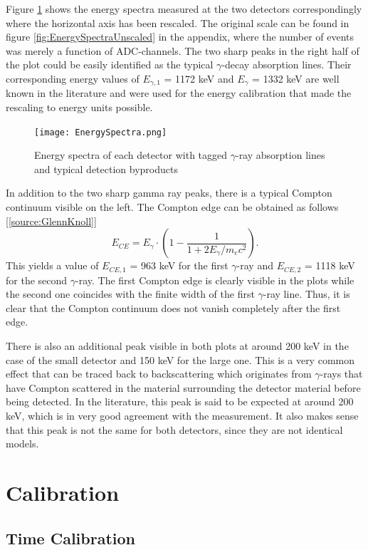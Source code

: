\documentclass[a4paper,parskip,11pt, DIV12]{scrreprt}
\begin{document}
		Figure \ref{fig:EnergySpectra} shows the energy spectra measured at the two detectors correspondingly where the horizontal axis has been rescaled. The original scale can be found in figure \ref{fig:EnergySpectraUnscaled} in the appendix, where the number of events was merely a function of ADC-channels. The two sharp peaks in the right half of the plot could be easily identified as the typical $\gamma$-decay absorption lines. Their corresponding energy values of $E_{\gamma,1}$ = 1172 keV and $E_{\gamma}$ = 1332 keV are well known in the literature and were used for the energy calibration that made the rescaling to energy units possible.	
		\begin{figure}[H]
\centering
\texttt{[image: EnergySpectra.png]}
\caption[EnergySpectra]{Energy spectra of each detector with tagged $\gamma$-ray absorption lines and typical detection byproducts}
\label{fig:EnergySpectra}
	\end{figure}	
		In addition to the two sharp gamma ray peaks, there is a typical Compton continuum visible on the left. The Compton edge can be obtained as follows [\ref{source:GlennKnoll}]
	\begin{equation}
E_{CE} = E_{\gamma} \cdot \left(1 - \frac{1}{1+2 E_{\gamma}/m_ec^2} \right).
\end{equation}
		This yields a value of $E_{CE,1}$ = 963 keV for the first $\gamma$-ray and $E_{CE,2}$ = 1118 keV for the second $\gamma$-ray. The first Compton edge is clearly visible in the plots while the second one coincides with the finite width of the first $\gamma$-ray line. Thus, it is clear that the Compton continuum does not vanish completely after the first edge.

		There is also an additional peak visible in both plots at around 200 keV in the case of the small detector and 150 keV for the large one. This is a very common effect that can be traced back to backscattering which originates from $\gamma$-rays that have Compton scattered in the material surrounding the detector material before being detected. In the literature, this peak is said to be expected at around 200 keV, which is in very good agreement with the measurement. It also makes sense that this peak is not the same for both detectors, since they are not identical models.


\chapter{Calibration}

\section{Time Calibration} \label{sec:TimeCal}
\end{document}
